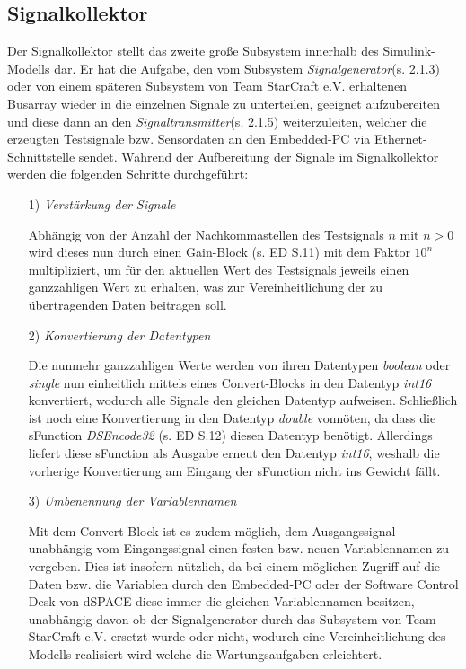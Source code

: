 \documentclass[fontsize = 12pt, paper = a4]{scrreprt}
\begin{document}
\subsection{Signalkollektor}

Der Signalkollektor stellt das zweite große Subsystem innerhalb des Simulink-Modells dar. Er hat die Aufgabe, den vom Subsystem \textit{Signalgenerator}(s. 2.1.3) oder von einem späteren Subsystem von Team StarCraft e.V. erhaltenen Busarray wieder in die einzelnen Signale zu unterteilen, geeignet aufzubereiten und diese dann an den \textit{Signaltransmitter}(s. 2.1.5) weiterzuleiten, welcher die erzeugten Testsignale bzw. Sensordaten an den Embedded-PC via Ethernet-Schnittstelle sendet. Während der Aufbereitung der Signale im Signalkollektor werden die folgenden Schritte durchgeführt:

\begin{itemize}

\item[1)] \textit{Verstärkung der Signale}

Abhängig von der Anzahl der Nachkommastellen des Testsignals $n$ mit $n > 0$ wird dieses nun durch einen Gain-Block (s. ED S.11) mit dem Faktor $10^n$ multipliziert, um für den aktuellen Wert des Testsignals jeweils einen ganzzahligen Wert zu erhalten,
was zur Vereinheitlichung der zu übertragenden Daten beitragen soll.

\newpage

\item[2)] \textit{Konvertierung der Datentypen}

Die nunmehr ganzzahligen Werte werden von ihren Datentypen \textit{boolean} oder \textit{single} nun einheitlich mittels eines Convert-Blocks in den Datentyp \textit{int16} konvertiert, wodurch alle Signale den gleichen Datentyp aufweisen. Schließlich ist noch eine Konvertierung in den Datentyp \textit{double} vonnöten, da dass die sFunction \textit{DSEncode32} (s. ED S.12) diesen Datentyp benötigt. Allerdings liefert diese sFunction als Ausgabe erneut den Datentyp \textit{int16}, weshalb die vorherige Konvertierung am Eingang der sFunction nicht ins Gewicht fällt.  

\item[3)] \textit{Umbenennung der Variablennamen}

Mit dem Convert-Block ist es zudem möglich, dem Ausgangssignal unabhängig vom Eingangssignal einen festen bzw. neuen Variablennamen zu vergeben. Dies ist insofern nützlich, da bei einem möglichen Zugriff auf die Daten bzw. die Variablen durch
den Embedded-PC oder der Software Control Desk von dSPACE diese immer die gleichen Variablennamen besitzen, unabhängig davon ob der Signalgenerator durch das Subsystem von Team StarCraft e.V. ersetzt
wurde oder nicht, wodurch eine Vereinheitlichung des Modells realisiert wird welche die Wartungsaufgaben erleichtert.

\end{itemize}
\end{document}
